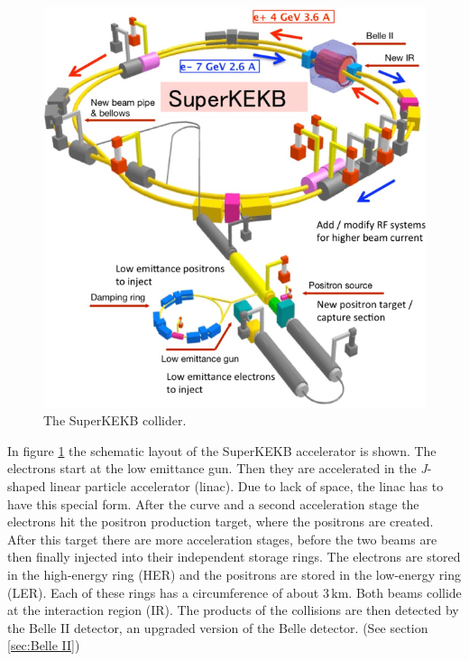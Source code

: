 \documentclass[a4paper,11pt,twosided,final,german,openbib,pdftex,listof=totoc,bibliography=totoc]{scrbook}
\begin{document}
\begin{figure}[h!]
\begin{center}
	\includegraphics[width=\textwidth]{Bilder/SuperKEKB.png}
	
	\caption[SuperKEKB Collider]{The SuperKEKB collider.\cite{SKEKAcc}}
	\label{fig:SuperKEKB}
\end{center}
\end{figure}


In figure \ref{fig:SuperKEKB} the schematic layout of the SuperKEKB accelerator is shown. The electrons start at the low emittance gun. Then they are accelerated in the \textit{J}-shaped linear particle accelerator (linac). Due to lack of space, the linac has to have this special form.\cite{KEKBJArc} After the curve and a second acceleration stage the electrons hit the positron production target, where the positrons are created. After this target there are more acceleration stages, before the two beams are then finally injected into their independent storage rings. The electrons are stored in the high-energy ring (HER) and the positrons are stored in the low-energy ring (LER). Each of these rings has a circumference of about $3\,\textrm{km}$. Both beams collide at the interaction region (IR). The products of the collisions are then detected by the Belle II detector, an upgraded version of the Belle detector.\cite{B2B} (See section \ref{sec:Belle II})
\end{document}
